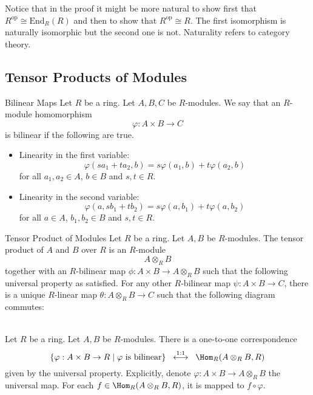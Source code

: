\documentclass[a4paper]{article}
\begin{document}
Notice that in the proof it might be more natural to show first that $R^\text{op}\cong\text{End}_R(R)$ and then to show that $R^\text{op}\cong R$. The first isomorphism is naturally isomorphic but the second one is not. Naturality refers to category theory. 

\subsection{Tensor Products of Modules}
\begin{defn}{Bilinear Maps}{} Let $R$ be a ring. Let $A,B,C$ be $R$-modules. We say that an $R$-module homomorphism $$\varphi:A\times B\to C$$ is bilinear if the following are true. 
\begin{itemize}
\item Linearity in the first variable: $$\varphi(sa_1+ta_2,b)=s\varphi(a_1,b)+t\varphi(a_2,b)$$ for all $a_1,a_2\in A$, $b\in B$ and $s,t\in R$. 
\item Linearity in the second variable: $$\varphi(a,sb_1+tb_2)=s\varphi(a,b_1)+t\varphi(a,b_2)$$ for all $a\in A$, $b_1,b_2\in B$ and $s,t\in R$. 
\end{itemize}
\end{defn}

\begin{defn}{Tensor Product of Modules}{} Let $R$ be a ring. Let $A,B$ be $R$-modules. The tensor product of $A$ and $B$ over $R$ is an $R$-module $$A\otimes_R B$$ together with an $R$-bilinear map $\phi:A\times B\to A\otimes_RB$ such that the following universal property as satisfied. For any other $R$-bilinear map $\psi:A\times B\to C$, there is a unique $R$-linear map $\theta:A\otimes_RB\to C$ such that the following diagram commutes: \\~\\
\end{defn}

\begin{prp}{}{} Let $R$ be a ring. Let $A,B$ be $R$-modules. There is a one-to-one correspondence $$\left\{\varphi:A\times B\to R\;|\;\varphi\text{ is bilinear}\right\}\;\;\overset{1:1}{\longleftrightarrow}\;\;\Hom_R(A\otimes_RB,R)$$ given by the universal property. Explicitly, denote $\varphi:A\times B\to A\otimes_R B$ the universal map. For each $f\in\Hom_R(A\otimes_RB,R)$, it is mapped to $f\circ\varphi$. 
\end{prp}
\end{document}
